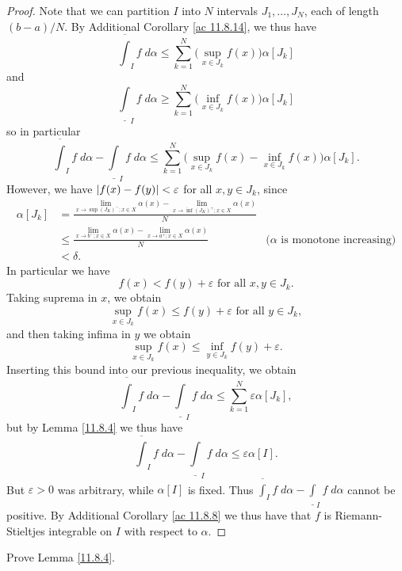 \begin{proof}
    Note that we can partition \(I\) into \(N\) intervals \(J_1, \dots, J_N\), each of length \((b - a) / N\).
    By Additional Corollary \ref{ac 11.8.14}, we thus have
    \[
        \overline{\int}_I f \; d \alpha \leq \sum_{k = 1}^N \big(\sup_{x \in J_k} f(x)\big) \alpha[J_k]
    \]
    and
    \[
        \underline{\int}_I f \; d \alpha \geq \sum_{k = 1}^N \big(\inf_{x \in J_k} f(x)\big) \alpha[J_k]
    \]
    so in particular
    \[
        \overline{\int}_I f \; d \alpha - \underline{\int}_I f \; d \alpha \leq \sum_{k = 1}^N \big(\sup_{x \in J_k} f(x) - \inf_{x \in J_k} f(x)\big) \alpha[J_k].
    \]
    However, we have \(\abs*{f(x) - f(y)} < \varepsilon\) for all \(x, y \in J_k\), since
    \begin{align*}
        \alpha[J_k] & = \frac{\lim_{x \to \sup(J_K)^- ; x \in X} \alpha(x) - \lim_{x \to \inf(J_K)^+ ; x \in X} \alpha(x)}{N}                                              \\
                    & \leq \frac{\lim_{x \to b^- ; x \in X} \alpha(x) - \lim_{x \to a^+ ; x \in X} \alpha(x)}{N}              & \text{(\(\alpha\) is monotone increasing)} \\
                    & < \delta.
    \end{align*}
    In particular we have
    \[
        f(x) < f(y) + \varepsilon \text{ for all } x, y \in J_k.
    \]
    Taking suprema in \(x\), we obtain
    \[
        \sup_{x \in J_k} f(x) \leq f(y) + \varepsilon \text{ for all } y \in J_k,
    \]
    and then taking infima in \(y\) we obtain
    \[
        \sup_{x \in J_k} f(x) \leq \inf_{y \in J_k} f(y) + \varepsilon.
    \]
    Inserting this bound into our previous inequality, we obtain
    \[
        \overline{\int}_I f \; d \alpha - \underline{\int}_I f \; d \alpha \leq \sum_{k = 1}^N \varepsilon \alpha[J_k],
    \]
    but by Lemma \ref{11.8.4} we thus have
    \[
        \overline{\int}_I f \; d \alpha - \underline{\int}_I f \; d \alpha \leq \varepsilon \alpha[I].
    \]
    But \(\varepsilon > 0\) was arbitrary, while \(\alpha[I]\) is fixed.
    Thus \(\overline{\int}_I f \; d \alpha - \underline{\int}_I f \; d \alpha\) cannot be positive.
    By Additional Corollary \ref{ac 11.8.8} we thus have that \(f\) is Riemann-Stieltjes integrable on \(I\) with respect to \(\alpha\).
\end{proof}

\exercisesection

\begin{exercise}\label{ex 11.8.1}
    Prove Lemma \ref{11.8.4}.
\end{exercise}


